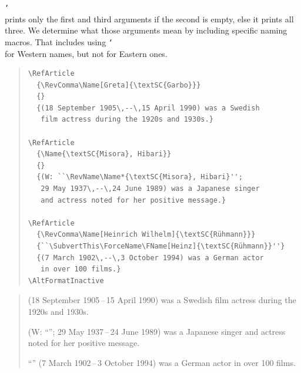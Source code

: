\documentclass[oneside]{article}
\makeatletter
\newcounter{VerbLine}
\def\cmd#1{\cs{\expandafter\cmd@to@cs\string#1}}
\def\cmd@to@cs#1#2{\char\number`#2\relax}
\DeclareRobustCommand\cs[1]{\texttt{\char`\\#1}}
\newcommand*\ContinueNum{\def\verbatim@processline{\stepcounter{VerbLine}\leavevmode\llap{\footnotesize\normalfont\theVerbLine\quad}\the\verbatim@line\par}}
\makeatother
\begin{document}
\cmd{\RefArticle} prints only the first and third arguments if the second is empty, else it prints all three. We determine what those arguments mean by including specific naming macros. That includes using \cmd{\RevComma} for Western names, but not for Eastern ones.

\begin{quote}\small
\ContinueNum
\begin{verbatim}
\RefArticle
  {\RevComma\Name[Greta]{\textSC{Garbo}}}
  {}
  {(18 September 1905\,--\,15 April 1990) was a Swedish
   film actress during the 1920s and 1930s.}

\RefArticle
  {\Name{\textSC{Misora}, Hibari}}
  {}
  {(W: ``\RevName\Name*{\textSC{Misora}, Hibari}'';
   29 May 1937\,--\,24 June 1989) was a Japanese singer
   and actress noted for her positive message.}

\RefArticle
  {\RevComma\Name[Heinrich Wilhelm]{\textSC{Rühmann}}}
  {``\SubvertThis\ForceName\FName[Heinz]{\textSC{Rühmann}}''}
  {(7 March 1902\,--\,3 October 1994) was a German actor
   in over 100 films.}
\AltFormatInactive
\end{verbatim}
\end{quote}

\begin{quote}\small
\RefArticle
  {\RevComma{}}
  {}
  {(18 September 1905\,--\,15 April 1990) was a Swedish
   film actress during the 1920s and 1930s.}

\RefArticle
  {}
  {}%
  {(W: ``\RevName{}'';
   29 May 1937\,--\,24 June 1989) was a Japanese singer
   and actress noted for her positive message.}

\RefArticle
  {\RevComma{}}
  {``\SubvertThis\ForceName{}''}
  {(7 March 1902\,--\,3 October 1994) was a German actor
   in over 100 films.}
\end{quote}

\AltFormatInactive
\newpage
\end{document}
